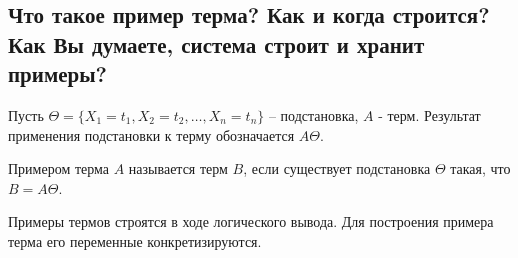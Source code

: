 \documentclass[a4paper,12pt]{article}
\begin{document}
\subsection*{Что такое пример терма? Как и когда строится? Как Вы думаете, система строит и хранит примеры?}
Пусть $\Theta =  \{X_1 = t_1, X_2= t_2, \dots , X_n = t_n \}$   –   подстановка, $A$ - терм. Результат применения подстановки к терму обозначается $A\Theta$.

Примером терма $A$ называется терм $B$, если существует подстановка $\Theta$ такая, что $B = A\Theta$.

Примеры термов строятся в ходе логического вывода. Для построения примера терма его переменные конкретизируются.
\end{document}
